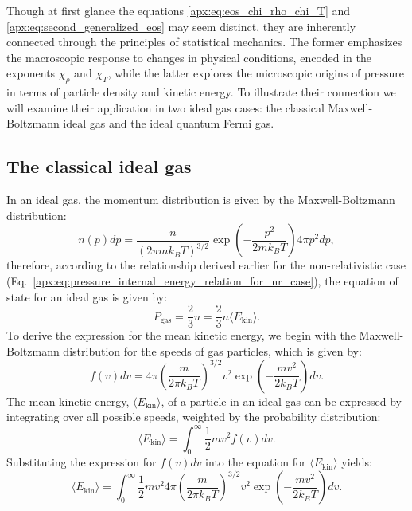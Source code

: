 \documentclass[main.tex]{subfiles}
\begin{document}
Though at first glance the equations \eqref{apx:eq:eos_chi_rho_chi_T} and \eqref{apx:eq:second_generalized_eos} may seem distinct, they are inherently connected through the principles of statistical mechanics. The former emphasizes the macroscopic response to changes in physical conditions, encoded in the exponents $\chi_\rho$ and $\chi_T$, while the latter explores the microscopic origins of pressure in terms of particle density and kinetic energy. To illustrate their connection we will examine their application in two ideal gas cases: the classical Maxwell-Boltzmann ideal gas and the ideal quantum Fermi gas.

\subsection{The classical ideal gas}
In an ideal gas, the momentum distribution is given by the Maxwell-Boltzmann distribution:
\begin{equation}
    n(p) dp = \frac{n}{(2\pi m k_BT)^{3/2}} \exp\left(- \frac{p^2}{2mk_BT}\right) 4\pi p^2 dp,
\end{equation}
therefore, according to the relationship derived earlier for the non-relativistic case (Eq.~\ref{apx:eq:pressure_internal_energy_relation_for_nr_case}), the equation of state for an ideal gas is given by:
\begin{equation}\label{apx:eq:pgas}
    P_{\text{gas}} = \frac{2}{3}u = \frac{2}{3} n \langle E_{\text{kin}} \rangle.
\end{equation}
To derive the expression for the mean kinetic energy, we begin with the Maxwell-Boltzmann distribution for the speeds of gas particles, which is given by:
\begin{equation*}
    f(v)dv = 4\pi \left( \frac{m}{2\pi k_BT} \right)^{3/2} v^2 \exp\left(-\frac{mv^2}{2k_BT}\right)dv.
\end{equation*}
The mean kinetic energy, $\langle E_{\text{kin}} \rangle$, of a particle in an ideal gas can be expressed by integrating over all possible speeds, weighted by the probability distribution:
\begin{equation*}
    \langle E_{\text{kin}} \rangle = \int_{0}^{\infty} \frac{1}{2} m v^2 f(v) dv.
\end{equation*}
Substituting the expression for $f(v)dv$ into the equation for $\langle E_{\text{kin}} \rangle$ yields:
\begin{equation*}
    \langle E_{\text{kin}} \rangle = \int_{0}^{\infty} \frac{1}{2} m v^2 4\pi \left( \frac{m}{2\pi k_BT} \right)^{3/2} v^2 \exp\left(-\frac{mv^2}{2k_BT}\right) dv.
\end{equation*}
\end{document}
